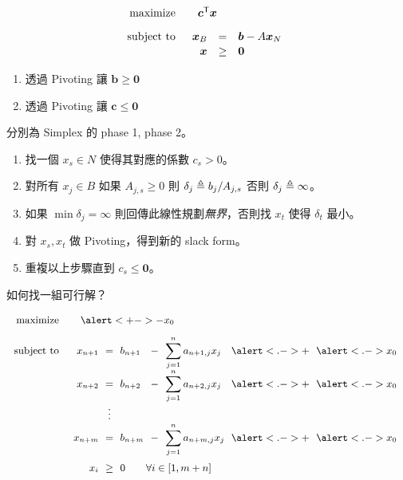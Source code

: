 \documentclass[standalone]{beamer}
\begin{document}
\begin{frame}{}
\[
\linearprog{\bm{c}^\mathsf{T} \bm{x}}{
  \begin{array}[t]{rcl}
    \bm{x}_B & = & \bm{b} - A \bm{x}_N \\
    \bm{x}  & \geq & \bm{0}
  \end{array}
}
\]
\pause
\begin{enumerate}[<+->]
  \item 透過 Pivoting 讓 $\bm{b} \geq \bm{0}$
  \item 透過 Pivoting 讓 $\bm{c} \leq \bm{0}$
\end{enumerate}
\pause \bigskip

分別為 Simplex 的 phase 1, phase 2。
\end{frame}

\begin{frame}{}
\begin{enumerate}[<+->]
  \itemsep=1ex
  \item 找一個 $x_s \in N$ 使得其對應的係數 $c_s > 0$。
  \item 對所有 $x_j \in B$ 如果 $A_{j, s} \geq 0$ 則 $\delta_j \triangleq b_j / A_{j, s}$ 否則 $\delta_j \triangleq \infty$。
  \item 如果 $\min \delta_j = \infty$ 則回傳此線性規劃\emph{無界}，否則找 $x_t$ 使得 $\delta_t$ 最小。
  \item 對 $x_s, x_t$ 做 Pivoting，得到新的 slack form。
  \item 重複以上步驟直到 $c_s \leq \bm{0}$。
\end{enumerate}
\bigskip

\end{frame}

\begin{frame}{}
  如何找一組可行解？
  \pause

  \[
    \small
    \linearprog{\alert<+->{- x_0}}{
    \arraycolsep=3pt
    \begin{array}[t]{rc>{\displaystyle}lc>{\displaystyle}lcl}
      x_{n+1} & = & b_{n+1} &-& \sum_{j=1}^n a_{n+1, j} x_j &\alert<.->{+}& \alert<.->{x_0}\\
      x_{n+2} & = & b_{n+2} &-& \sum_{j=1}^n a_{n+2, j} x_j &\alert<.->{+}& \alert<.->{x_0}\\
              & \vdots     &                            \\
      x_{n+m} & = & b_{n+m} &-& \sum_{j=1}^n a_{n+m, j} x_j &\alert<.->{+}& \alert<.->{x_0}\\[15pt]
      x_i & \geq & \multicolumn{3}{l}{0 \quad\quad \forall i \in [1, m+n]} \\
    \end{array}
    }
  \]
\end{frame}
\end{document}
